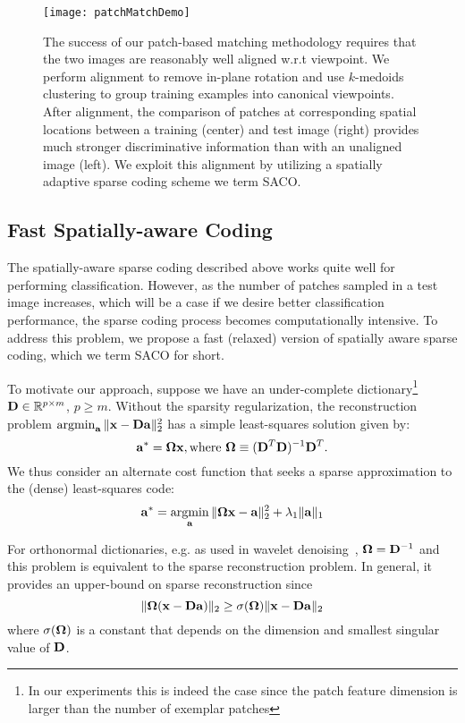 \documentclass[10pt,twocolumn,letterpaper]{article}
\def\a{{\bf a}}
\def\D{{\bf D}}
\def\x{{\bf x}}
\def\RB{{\mathbb R}}
\def\argmin{\mathop{\rm argmin}}
\begin{document}
\begin{figure}[t]
\centering
   \texttt{[image: patchMatchDemo]}
\vspace{-1mm}
   \caption{The success of our patch-based matching methodology requires that
   the two images are reasonably well aligned w.r.t viewpoint.  We perform
   alignment to remove in-plane rotation and use $k$-medoids clustering to
   group training examples into canonical viewpoints.  After alignment, the
   comparison of patches at corresponding spatial locations between a training
   (center) and test image (right) provides much stronger discriminative
   information than with an unaligned image (left). We exploit this alignment
   by utilizing a spatially adaptive sparse coding scheme we term SACO.}
\label{fig:patchMatchDemo}
\vspace{-2mm}
\end{figure}

\subsection{Fast Spatially-aware Coding}
The spatially-aware sparse coding described above works quite well for
performing classification.  However, as the number of patches sampled in a test
image increases, which will be a case if we desire better classification
performance, the sparse coding process becomes computationally intensive.  To
address this problem, we propose a fast (relaxed) version of spatially aware
sparse coding, which we term SACO for short.

To motivate our approach, suppose we have an under-complete dictionary\footnote{In our experiments this is indeed the case since the patch feature
dimension is larger than the number of exemplar patches} $\D \in \RB^{p\times
m}$, $p\ge m$.  Without the sparsity regularization, the reconstruction problem
$\argmin_{\a}\Vert \x - \D\a \Vert_2^2$ has a simple least-squares
solution given by:
\begin{equation}
\a^* = {\bf \Omega} \x, \text{where } {\bf \Omega}\equiv (\D^T \D) ^{-1}\D^T.
\end{equation}
We thus consider an alternate cost function that seeks a sparse approximation
to the (dense) least-squares code:
\begin{equation}
\a^*= \argmin_{\a}\Vert {\bf \Omega}\x - \a \Vert_2^2 + \lambda_1 \Vert \a \Vert_1
\end{equation}

For orthonormal dictionaries, e.g. as used in wavelet
denoising~\cite{donoho1994ideal,simoncelli1996noise}, ${\bf \Omega} = \D^{-1}$ and
this problem is equivalent to the sparse reconstruction problem.  In general,
it provides an upper-bound on sparse reconstruction since
\begin{equation}
\Vert {\bf \Omega}(\x - \D \a) \Vert_2 \geq \sigma({\bf \Omega}) \Vert \x - \D \a \Vert_2
\end{equation}
where $\sigma({\bf \Omega})$ is a constant that depends on the dimension
and smallest singular value of $\D$.
\end{document}
